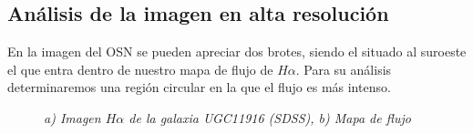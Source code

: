 \documentclass{article}
\newcommand{\hal}{$H\alpha$}
\begin{document}
\subsection{Análisis de la imagen en alta resolución}
En la imagen del OSN se pueden apreciar dos brotes, siendo el situado al suroeste el que entra dentro de nuestro mapa de flujo de \hal. Para su análisis determinaremos una región circular en la que el flujo es más intenso.
\begin{figure}[H]
	\centering
	\caption{\emph{a) Imagen $H\alpha$ de la galaxia UGC11916 (SDSS), b) Mapa de flujo}}
	\label{figura 4}
\end{figure} 
\end{document}
